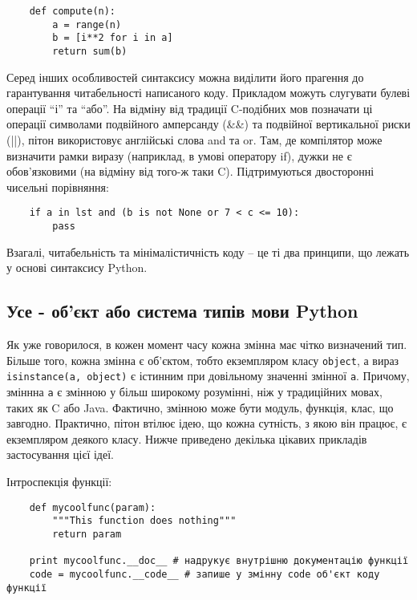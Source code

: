 \documentclass[a4paper, 12pt, onsedie]{article}
\begin{document}
    \begin{verbatim}
    def compute(n):
        a = range(n)
        b = [i**2 for i in a]
        return sum(b)
    \end{verbatim}

    Серед інших особливостей синтаксису можна виділити його прагення до
    гарантування читабельності написаного коду. Прикладом можуть слугувати булеві операції ``і''
    та ``або''. На відміну від традиції C-подібних мов позначати ці операції символами подвійного
    амперсанду (\&\&) та подвійної вертикальної риски (||), пітон використовує англійські слова
    and та or. Там, де компілятор може визначити рамки виразу (наприклад, в умові оператору if),
    дужки не є обов'язковими (на відміну від того-ж таки C). Підтримуються двосторонні чисельні
    порівняння:

    \begin{verbatim}
    if a in lst and (b is not None or 7 < c <= 10):
        pass
    \end{verbatim}

    Взагалі, читабельність та
    мінімалістичність коду -- це ті два принципи, що лежать у основі синтаксису Python.

\subsection{Усе - об'єкт або система типів мови Python}
    Як уже говорилося, в кожен момент часу кожна змінна має чітко визначений тип. Більше того,
    кожна змінна є об'єктом, тобто екземпляром класу \texttt{object}, а вираз 
    \texttt{isinstance(a, object)} є істинним при довільному значенні змінної \texttt{a}. 
    Причому, зміннна \texttt{a} є змінною у більш широкому розумінні, ніж у традиційних
    мовах, таких як C або Java. Фактично, змінною може бути модуль, функція, клас,
    що завгодно. Практично, пітон втілює ідею, що кожна сутність, з якою він працює, є 
    екземпляром деякого класу. Нижче приведено декілька цікавих прикладів застосування
    цієї ідеї.

    Інтроспекція функції:

    \begin{verbatim}
    def mycoolfunc(param):
        """This function does nothing"""
        return param

    print mycoolfunc.__doc__ # надрукує внутрішню документацію функції
    code = mycoolfunc.__code__ # запише у змінну code об'єкт коду функції
    \end{verbatim}
\end{document}
